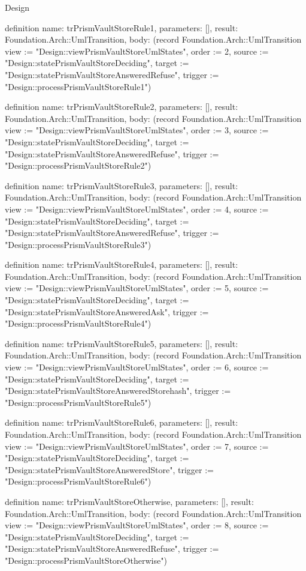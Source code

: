\begin{lexlean}{Design}
\begin{semanticmodule}
definition{
  name: trPrismVaultStoreRule1,
  parameters: [],
  result: Foundation.Arch::UmlTransition,
  body: (record Foundation.Arch::UmlTransition {view := "Design::viewPrismVaultStoreUmlStates", order := 2, source := "Design::statePrismVaultStoreDeciding", target := "Design::statePrismVaultStoreAnsweredRefuse", trigger := "Design::processPrismVaultStoreRule1"})
}

definition{
  name: trPrismVaultStoreRule2,
  parameters: [],
  result: Foundation.Arch::UmlTransition,
  body: (record Foundation.Arch::UmlTransition {view := "Design::viewPrismVaultStoreUmlStates", order := 3, source := "Design::statePrismVaultStoreDeciding", target := "Design::statePrismVaultStoreAnsweredRefuse", trigger := "Design::processPrismVaultStoreRule2"})
}

definition{
  name: trPrismVaultStoreRule3,
  parameters: [],
  result: Foundation.Arch::UmlTransition,
  body: (record Foundation.Arch::UmlTransition {view := "Design::viewPrismVaultStoreUmlStates", order := 4, source := "Design::statePrismVaultStoreDeciding", target := "Design::statePrismVaultStoreAnsweredRefuse", trigger := "Design::processPrismVaultStoreRule3"})
}

definition{
  name: trPrismVaultStoreRule4,
  parameters: [],
  result: Foundation.Arch::UmlTransition,
  body: (record Foundation.Arch::UmlTransition {view := "Design::viewPrismVaultStoreUmlStates", order := 5, source := "Design::statePrismVaultStoreDeciding", target := "Design::statePrismVaultStoreAnsweredAsk", trigger := "Design::processPrismVaultStoreRule4"})
}

definition{
  name: trPrismVaultStoreRule5,
  parameters: [],
  result: Foundation.Arch::UmlTransition,
  body: (record Foundation.Arch::UmlTransition {view := "Design::viewPrismVaultStoreUmlStates", order := 6, source := "Design::statePrismVaultStoreDeciding", target := "Design::statePrismVaultStoreAnsweredStorehash", trigger := "Design::processPrismVaultStoreRule5"})
}

definition{
  name: trPrismVaultStoreRule6,
  parameters: [],
  result: Foundation.Arch::UmlTransition,
  body: (record Foundation.Arch::UmlTransition {view := "Design::viewPrismVaultStoreUmlStates", order := 7, source := "Design::statePrismVaultStoreDeciding", target := "Design::statePrismVaultStoreAnsweredStore", trigger := "Design::processPrismVaultStoreRule6"})
}

definition{
  name: trPrismVaultStoreOtherwise,
  parameters: [],
  result: Foundation.Arch::UmlTransition,
  body: (record Foundation.Arch::UmlTransition {view := "Design::viewPrismVaultStoreUmlStates", order := 8, source := "Design::statePrismVaultStoreDeciding", target := "Design::statePrismVaultStoreAnsweredRefuse", trigger := "Design::processPrismVaultStoreOtherwise"})
}


\end{semanticmodule}
\end{lexlean}

